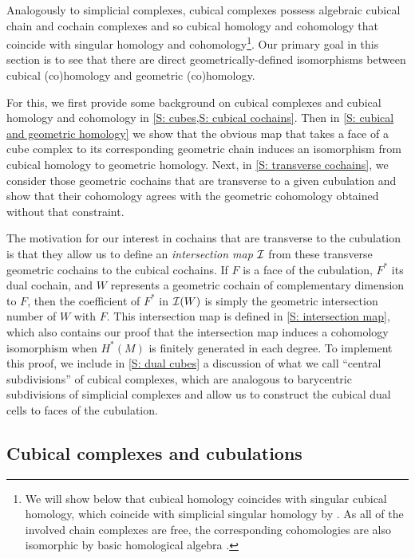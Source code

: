 Analogously to simplicial complexes, cubical complexes possess algebraic cubical chain and cochain complexes and so cubical homology and cohomology that coincide with singular homology and cohomology\footnote{We will show below that cubical homology coincides with singular cubical homology, which coincide with simplicial singular homology by \cite{EM53}.
As all of the involved chain complexes are free, the corresponding cohomologies are also isomorphic by basic homological algebra \cite[Theorem 45.5]{Mun84}.\label{FN: cubical and singular}}.
Our primary goal in this section is to see that there are direct geometrically-defined isomorphisms between cubical (co)homology and geometric (co)homology.

For this, we first provide some background on cubical complexes and cubical homology and cohomology in \cref{S: cubes,S: cubical cochains}.
Then in \cref{S: cubical and geometric homology} we show that the obvious map that takes a face of a cube complex to its corresponding geometric chain induces an isomorphism from cubical homology to geometric homology.
Next, in \cref{S: transverse cochains}, we consider those geometric cochains that are transverse to a given cubulation and show that their cohomology agrees with the geometric cohomology obtained without that constraint.

The motivation for our interest in cochains that are transverse to the cubulation is that they allow us to define an \textit{intersection map} $\mathcal{I}$ from these transverse geometric cochains to the cubical cochains.
If $F$ is a face of the cubulation, $F^*$ its dual cochain, and $W$ represents a geometric cochain of complementary dimension to $F$, then the coefficient of $F^*$ in $\mathcal{I}(W)$ is simply the geometric intersection number of $W$ with $F$.
This intersection map is defined in \cref{S: intersection map}, which also contains our proof that the intersection map induces a cohomology isomorphism when $H^*(M)$ is finitely generated in each degree.
To implement this proof, we include in \cref{S: dual cubes} a discussion of what we call ``central subdivisions'' of cubical complexes, which are analogous to barycentric subdivisions of simplicial complexes and allow us to construct the cubical dual cells to faces of the cubulation.

\subsection{Cubical complexes and cubulations}\label{S: cubes}

